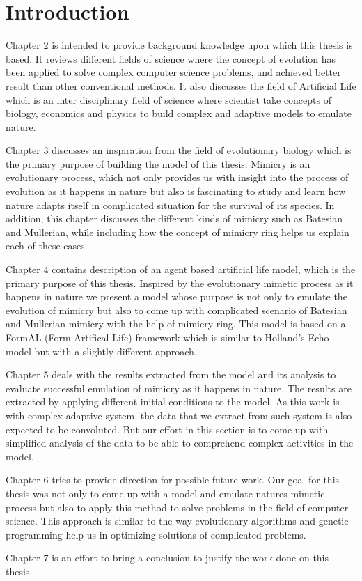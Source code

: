 \chapter{Introduction}


Chapter 2 is intended to provide background knowledge upon which this thesis is based. It reviews different fields of science where the concept of evolution has been applied to solve complex computer science problems, and achieved better result than other conventional methods. It also discusses the field of Artificial Life which is an inter disciplinary field of science where scientist take concepts of biology, economics and physics to build complex and adaptive models to emulate nature. 

Chapter 3 discusses an inspiration from the field of evolutionary biology which is the primary purpose of building the model of this thesis. Mimicry is an evolutionary process, which not only provides us with insight into the process of evolution as it happens in nature but also is fascinating to study and learn how nature adapts itself in complicated situation for the survival of its species. In addition, this chapter discusses the different kinds of mimicry such as Batesian and Mullerian, while including how the concept of mimicry ring helps us explain each of these cases. 

Chapter 4 contains description of an agent based artificial life model, which is the primary purpose of this thesis. Inspired by the evolutionary mimetic process as it happens in nature we present a model whose purpose is not only to emulate the evolution of mimicry but also to come up with complicated scenario of Batesian and Mullerian mimicry with the help of mimicry ring. This model is based on a FormAL (Form Artifical Life) framework which is similar to Holland's Echo model but with a slightly different approach. 

Chapter 5 deals with the results extracted from the model and its analysis to evaluate successful emulation of mimicry as it happens in nature. The results are extracted by applying different initial conditions to the model. As this work is with complex adaptive system, the data that we extract from such system is also expected to be convoluted. But our effort in this section is to come up with simplified analysis of the data to be able to comprehend complex activities in the model. 

Chapter 6 tries to provide direction for possible future work. Our goal for this thesis was not only to come up with a model and emulate natures mimetic process but also to apply this method to solve problems in the field of computer science. This approach is similar to the way evolutionary algorithms and genetic programming help us in optimizing solutions of complicated problems. 

Chapter 7 is an effort to bring a conclusion to justify the work done on this thesis. 